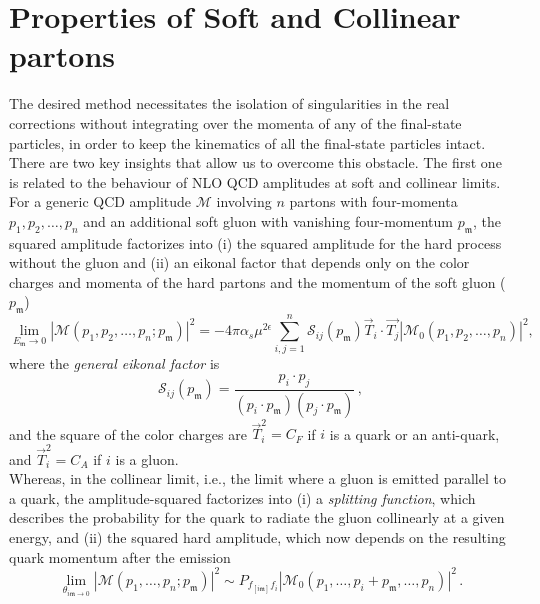 \documentclass[a4paper, 12pt]{book}
\newcommand{\um}{\mathfrak{m}}
\begin{document}
\section{Properties of Soft and Collinear partons}
\label{properties}
The desired method necessitates the isolation of singularities in the real corrections without integrating over the momenta of any of the final-state particles, in order to keep the kinematics of all the final-state particles intact. There are two key insights that allow us to overcome this obstacle. The first one is related to the behaviour of NLO QCD amplitudes at soft and collinear limits. \\For a generic QCD amplitude $\mathcal{M}$ involving $n$ partons with four-momenta $p_1, p_2, \dots, p_n$ and an additional soft gluon with vanishing four-momentum $p_\um$, the squared amplitude factorizes into (i) the squared amplitude for the hard process without the gluon and (ii) an eikonal factor that depends only on the color charges and momenta of the hard partons and the momentum of the soft gluon ($p_\um$) \cite{Catani:1999ss}
\begin{equation}
    \lim_{E_\um \rightarrow 0}|\mathcal{M}(p_1, p_2, \dots, p_n; p_\um)|^2= - 4\pi \alpha_s \mu^{2\epsilon} \sum_{i,j=1}^n \mathcal{S}_{ij}(p_\um) \vec{T}_i \cdot \vec{T_j} |\mathcal{M}_0(p_1, p_2, \dots, p_n)|^2,
    \label{ampl-soft}
\end{equation}
where the \emph{general eikonal factor} is
\begin{equation}
    \mathcal{S}_{ij}(p_\um) = \frac{p_i \cdot p_j}{(p_i \cdot p_\um)(p_j \cdot p_\um)}  \,, 
    \label{eikonal}
\end{equation}
and the square of the color charges are $\vec{T}_i^2= C_F$ if $i$ is a quark or an anti-quark, and $\vec{T}_i^2= C_A$ if $i$ is a gluon. \\
Whereas, in the collinear limit, i.e., the limit where a gluon is emitted parallel to a quark, the amplitude-squared factorizes into (i) a \emph{splitting function}, which describes the probability for the quark to radiate the gluon collinearly at a given energy, and (ii) the squared hard amplitude, which now depends on the resulting quark momentum after the emission
\begin{equation}
    \lim_{\theta_{i \um \rightarrow 0}}|\mathcal{M}(p_1, \dots, p_n; p_\um)|^2 \sim P_{f_{[i\um]}f_i} |\mathcal{M}_0(p_1, \dots , p_i + p_\um, \dots, p_n)|^2  \,.
    \label{ampl-coll}
\end{equation}
\end{document}
